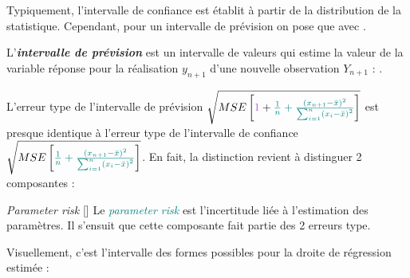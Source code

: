 \documentclass[french]{article}
\begin{document}
\begin{multicols*}{2}
\begin{definitionNOHFILL}
\begin{rappel_enhanced}[Contexte]
Typiquement, l'intervalle de confiance est établit à partir de la distribution de la statistique. Cependant, pour un intervalle de prévision on pose que  avec . 
\end{rappel_enhanced}

L'\textbf{\textit{intervalle de prévision}} est un intervalle de valeurs qui estime la valeur de la variable réponse pour la réalisation $y_{n + 1}$ d'une nouvelle observation $Y_{n + 1}$ : .
\end{definitionNOHFILL}

\bigskip

L'erreur type de l'intervalle de prévision $\sqrt{MSE \left[\textcolor{amethyst}{1} + \textcolor{teal}{\frac{1}{n} + \frac{\left(x_{n + 1} - \bar{x}\right)^{2}}{\sum_{i = 1}^{n}\left(x_{i} - \bar{x}\right)^{2}}}\right]}$ est presque identique à l'erreur type de l'intervalle de confiance $\sqrt{MSE \left[\textcolor{teal}{\frac{1}{n} + \frac{\left(x_{n + 1} - \bar{x}\right)^{2}}{\sum_{i = 1}^{n}\left(x_{i} - \bar{x}\right)^{2}}}\right]}$. En fait, la distinction revient à distinguer 2 composantes : 

\begin{definitionGENERAL}{\og \textit{Parameter risk} \fg{}}[]
Le \og \textit{\textcolor{teal}{parameter risk}} \fg{} est l'incertitude liée à l'estimation des paramètres. Il s'ensuit que cette composante fait partie des 2 erreurs type.

\bigskip

Visuellement, c'est l'intervalle des formes possibles pour la droite de régression estimée : 

\begin{center}
\begin{tikzpicture}[x=0.75pt,y=0.75pt,yscale=-1,xscale=1]


\end{tikzpicture}
\end{center}
\end{definitionGENERAL}
\end{multicols*}
\end{document}
